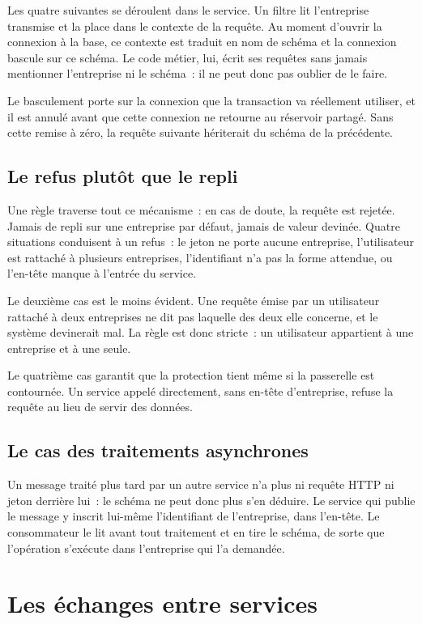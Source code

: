 Les quatre suivantes se déroulent dans le service. Un filtre lit l'entreprise transmise et la place
dans le contexte de la requête. Au moment d'ouvrir la connexion à la base, ce contexte est traduit en
nom de schéma et la connexion bascule sur ce schéma. Le code métier, lui, écrit ses requêtes sans
jamais mentionner l'entreprise ni le schéma~: il ne peut donc pas oublier de le faire.

Le basculement porte sur la connexion que la transaction va réellement utiliser, et il est annulé
avant que cette connexion ne retourne au réservoir partagé. Sans cette remise à zéro, la requête
suivante hériterait du schéma de la précédente.

\subsection{Le refus plutôt que le repli}

Une règle traverse tout ce mécanisme~: en cas de doute, la requête est rejetée. Jamais de repli sur
une entreprise par défaut, jamais de valeur devinée. Quatre situations conduisent à un refus~: le
jeton ne porte aucune entreprise, l'utilisateur est rattaché à plusieurs entreprises, l'identifiant
n'a pas la forme attendue, ou l'en-tête manque à l'entrée du service.

Le deuxième cas est le moins évident. Une requête émise par un utilisateur rattaché à deux
entreprises ne dit pas laquelle des deux elle concerne, et le système devinerait mal. La règle est
donc stricte~: un utilisateur appartient à une entreprise et à une seule.

Le quatrième cas garantit que la protection tient même si la passerelle est contournée. Un service
appelé directement, sans en-tête d'entreprise, refuse la requête au lieu de servir des données.

\subsection{Le cas des traitements asynchrones}

Un message traité plus tard par un autre service n'a plus ni requête HTTP ni jeton derrière lui~: le
schéma ne peut donc plus s'en déduire. Le service qui publie le message y inscrit lui-même
l'identifiant de l'entreprise, dans l'en-tête. Le consommateur le lit avant tout traitement et en
tire le schéma, de sorte que l'opération s'exécute dans l'entreprise qui l'a demandée.

\section{Les échanges entre services}
\label{sec:archi-echanges}

